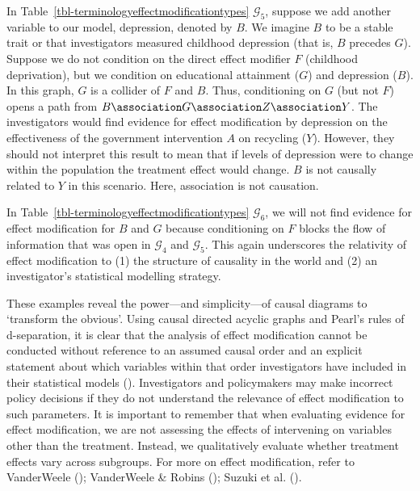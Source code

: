 \documentclass[
  single column]{article}
\begin{document}
In Table~\ref{tbl-terminologyeffectmodificationtypes} \(\mathcal{G}_5\),
suppose we add another variable to our model, depression, denoted by
\(B\). We imagine \(B\) to be a stable trait or that investigators
measured childhood depression (that is, \(B\) precedes \(G\)). Suppose
we do not condition on the direct effect modifier \(F\) (childhood
deprivation), but we condition on educational attainment (\(G\)) and
depression (\(B\)). In this graph, \(G\) is a collider of \(F\) and
\(B\). Thus, conditioning on \(G\) (but not \(F\)) opens a path from
\(B \association G \association Z \association Y\). The investigators
would find evidence for effect modification by depression on the
effectiveness of the government intervention \(A\) on recycling (\(Y\)).
However, they should not interpret this result to mean that if levels of
depression were to change within the population the treatment effect
would change. \(B\) is not causally related to \(Y\) in this scenario.
Here, association is not causation.

In Table~\ref{tbl-terminologyeffectmodificationtypes} \(\mathcal{G}_6\),
we will not find evidence for effect modification for \(B\) and \(G\)
because conditioning on \(F\) blocks the flow of information that was
open in \(\mathcal{G}_4\) and \(\mathcal{G}_5\). This again underscores
the relativity of effect modification to (1) the structure of causality
in the world and (2) an investigator's statistical modelling strategy.

These examples reveal the power---and simplicity---of causal diagrams to
`transform the obvious'. Using causal directed acyclic graphs and
Pearl's rules of d-separation, it is clear that the analysis of effect
modification cannot be conducted without reference to an assumed causal
order and an explicit statement about which variables within that order
investigators have included in their statistical models
(). Investigators and
policymakers may make incorrect policy decisions if they do not
understand the relevance of effect modification to such parameters. It
is important to remember that when evaluating evidence for effect
modification, we are not assessing the effects of intervening on
variables other than the treatment. Instead, we qualitatively evaluate
whether treatment effects vary across subgroups. For more on effect
modification, refer to VanderWeele
(); VanderWeele \& Robins
(); Suzuki et al.
().
\end{document}
